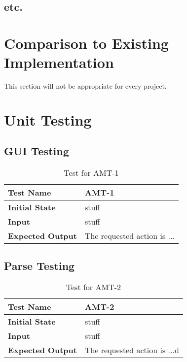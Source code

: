 \documentclass[12pt, titlepage]{article}
\begin{document}
\subsection{etc.}
	
\section{Comparison to Existing Implementation}	

This section will not be appropriate for every project.

\section{Unit Testing}
	\subsection{GUI Testing}
	
		\begin{table}[!htbp]
			
			\begin{tabularx}{\textwidth}{|l|X|}
				
				\hline
				
				\textbf{Test Name} & AMT-1
				\\ 
				\hline
				\textbf{Initial State} & stuff \\ 
				\hline
				\textbf{Input} & stuff  \\ 
				\hline 
				\textbf{Expected Output} & The requested action is ... \\ 
				\hline
				
			\end{tabularx}
			\caption{Test for AMT-1}
			\label{Table}
		\end{table}


	\subsection{Parse Testing}
	
		\begin{table}[!htbp]
			
			\begin{tabularx}{\textwidth}{|l|X|}
				
				\hline
				
				\textbf{Test Name} & AMT-2
				\\ 
				\hline
				\textbf{Initial State} & stuff \\ 
				\hline
				\textbf{Input} & stuff  \\ 
				\hline 
				\textbf{Expected Output} & The requested action is ...d \\ 
				\hline
				
			\end{tabularx}
			\caption{Test for AMT-2}
			\label{Table}
		\end{table}
\end{document}
